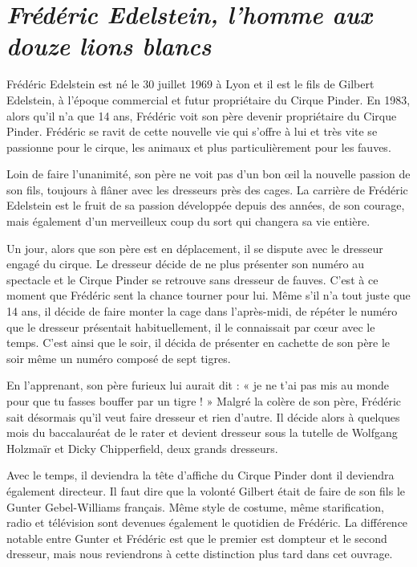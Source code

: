 \section*{\textit{Frédéric Edelstein, l’homme aux douze lions blancs}}

Frédéric Edelstein est né le 30 juillet 1969 à Lyon et il est le fils de Gilbert Edelstein, à l’époque commercial et futur propriétaire du Cirque Pinder. En 1983, alors qu'il n'a que 14 ans, Frédéric voit son père devenir propriétaire du Cirque Pinder. Frédéric se ravit de cette nouvelle vie qui s’offre à lui et très vite se passionne pour le cirque, les animaux et plus particulièrement pour les fauves.

Loin de faire l’unanimité, son père ne voit pas d’un bon œil la nouvelle passion de son fils, toujours à flâner avec les dresseurs près des cages. La carrière de Frédéric Edelstein est le fruit de sa passion développée depuis des années, de son courage, mais également d'un merveilleux coup du sort qui changera sa vie entière.

Un jour, alors que son père est en déplacement, il se dispute avec le dresseur engagé du cirque. Le dresseur décide de ne plus présenter son numéro au spectacle et le Cirque Pinder se retrouve sans dresseur de fauves. C’est à ce moment que Frédéric sent la chance tourner pour lui. Même s'il n’a tout juste que 14 ans, il décide de faire monter la cage dans l’après-midi, de répéter le numéro que le dresseur présentait habituellement, il le connaissait par cœur avec le temps. C’est ainsi que le soir, il décida de présenter en cachette de son père le soir même un numéro composé de sept tigres.

En l’apprenant, son père furieux lui aurait dit : « je ne t’ai pas mis au monde pour que tu fasses bouffer par un tigre ! » Malgré la colère de son père, Frédéric sait désormais qu’il veut faire dresseur et rien d’autre. Il décide alors à quelques mois du baccalauréat de le rater et devient dresseur sous la tutelle de Wolfgang Holzmaïr et Dicky Chipperfield, deux grands dresseurs.

Avec le temps, il deviendra la tête d’affiche du Cirque Pinder dont il deviendra également directeur. Il faut dire que la volonté Gilbert était de faire de son fils le Gunter Gebel-Williams français. Même style de costume, même starification, radio et télévision sont devenues également le quotidien de Frédéric. La différence notable entre Gunter et Frédéric est que le premier est dompteur et le second dresseur, mais nous reviendrons à cette distinction plus tard dans cet ouvrage.

